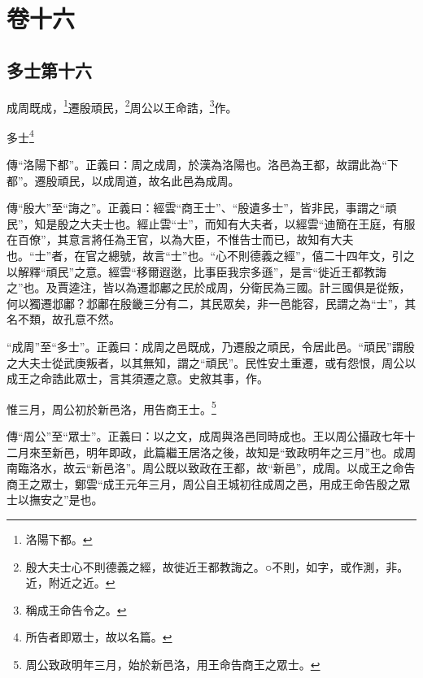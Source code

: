 

\chapter{卷十六}


\section{多士第十六}


成周既成，\footnote{洛陽下都。}遷殷頑民，\footnote{殷大夫士心不則德義之經，故徙近王都教誨之。○不則，如字，或作測，非。近，附近之近。}周公以王命誥，\footnote{稱成王命告令之。}作。

多士\footnote{所告者即眾士，故以名篇。}


{\noindent\zhuan{}\fzbyks 傳“洛陽下都”。正義曰：周之成周，於漢為洛陽也。洛邑為王都，故謂此為“下都”。遷殷頑民，以成周道，故名此邑為成周。 \par}

{\noindent\zhuan{}\fzbyks 傳“殷大”至“誨之”。正義曰：經雲“商王士”、“殷遺多士”，皆非民，事謂之“頑民”，知是殷之大夫士也。經止雲“士”，而知有大夫者，以經雲“迪簡在王庭，有服在百僚”，其意言將任為王官，以為大臣，不惟告士而已，故知有大夫也。“士”者，在官之總號，故言“士”也。“心不則德義之經”，僖二十四年文，引之以解釋“頑民”之意。經雲“移爾遐逖，比事臣我宗多遜”，是言“徙近王都教誨之”也。及賈逵注，皆以為遷邶鄘之民於成周，分衛民為三國。計三國俱是從叛，何以獨遷邶鄘？邶鄘在殷畿三分有二，其民眾矣，非一邑能容，民謂之為“士”，其名不類，故孔意不然。 \par}

{\noindent\shu{}\fzkt “成周”至“多士”。正義曰：成周之邑既成，乃遷殷之頑民，令居此邑。“頑民”謂殷之大夫士從武庚叛者，以其無知，謂之“頑民”。民性安土重遷，或有怨恨，周公以成王之命誥此眾士，言其須遷之意。史敘其事，作。 \par}

惟三月，周公初於新邑洛，用告商王士。\footnote{周公致政明年三月，始於新邑洛，用王命告商王之眾士。}


{\noindent\zhuan{}\fzbyks 傳“周公”至“眾士”。正義曰：以之文，成周與洛邑同時成也。王以周公攝政七年十二月來至新邑，明年即政，此篇繼王居洛之後，故知是“致政明年之三月”也。成周南臨洛水，故云“新邑洛”。周公既以致政在王都，故“新邑”，成周。以成王之命告商王之眾士，鄭雲“成王元年三月，周公自王城初往成周之邑，用成王命告殷之眾士以撫安之”是也。 \par}


